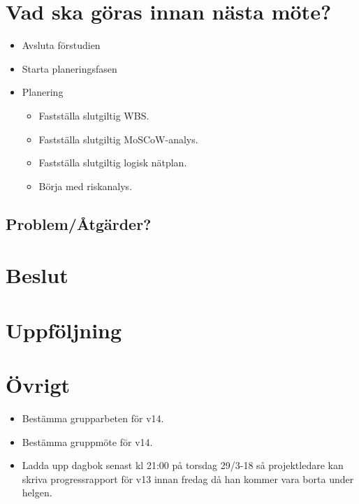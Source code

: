\section*{Vad ska göras innan nästa möte?}
\begin{itemize}[noitemsep]
    \item Avsluta förstudien
    \item Starta planeringsfasen
    \item Planering
    \begin{itemize}[noitemsep]
        \item Fastställa slutgiltig WBS.
        \item Fastställa slutgiltig MoSCoW-analys.
        \item Fastställa slutgiltig logisk nätplan.
        \item Börja med riskanalys.
    \end{itemize}
\end{itemize}

\subsection*{Problem/Åtgärder?}


\section*{Beslut}

\section*{Uppföljning}

\section*{Övrigt}
\begin{itemize}[noitemsep]
    \item Bestämma grupparbeten för v14.
    \item Bestämma gruppmöte för v14.
    \item Ladda upp dagbok senast kl 21:00 på torsdag 29/3-18 så projektledare kan skriva progressrapport för v13 innan fredag då han kommer vara borta under helgen.
\end{itemize}